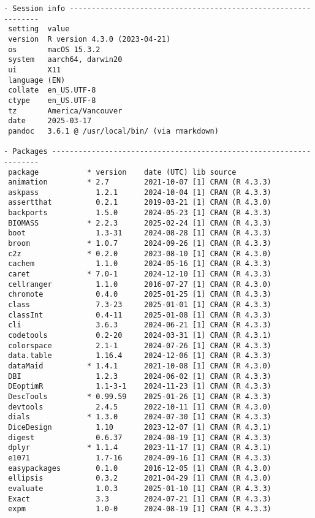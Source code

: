 \documentclass[
]{article}
\begin{document}
\begin{verbatim}
- Session info ---------------------------------------------------------------
 setting  value
 version  R version 4.3.0 (2023-04-21)
 os       macOS 15.3.2
 system   aarch64, darwin20
 ui       X11
 language (EN)
 collate  en_US.UTF-8
 ctype    en_US.UTF-8
 tz       America/Vancouver
 date     2025-03-17
 pandoc   3.6.1 @ /usr/local/bin/ (via rmarkdown)

- Packages -------------------------------------------------------------------
 package           * version    date (UTC) lib source
 animation         * 2.7        2021-10-07 [1] CRAN (R 4.3.3)
 askpass             1.2.1      2024-10-04 [1] CRAN (R 4.3.3)
 assertthat          0.2.1      2019-03-21 [1] CRAN (R 4.3.0)
 backports           1.5.0      2024-05-23 [1] CRAN (R 4.3.3)
 BIOMASS           * 2.2.3      2025-02-24 [1] CRAN (R 4.3.3)
 boot                1.3-31     2024-08-28 [1] CRAN (R 4.3.3)
 broom             * 1.0.7      2024-09-26 [1] CRAN (R 4.3.3)
 c2z               * 0.2.0      2023-08-10 [1] CRAN (R 4.3.0)
 cachem              1.1.0      2024-05-16 [1] CRAN (R 4.3.3)
 caret             * 7.0-1      2024-12-10 [1] CRAN (R 4.3.3)
 cellranger          1.1.0      2016-07-27 [1] CRAN (R 4.3.0)
 chromote            0.4.0      2025-01-25 [1] CRAN (R 4.3.3)
 class               7.3-23     2025-01-01 [1] CRAN (R 4.3.3)
 classInt            0.4-11     2025-01-08 [1] CRAN (R 4.3.3)
 cli                 3.6.3      2024-06-21 [1] CRAN (R 4.3.3)
 codetools           0.2-20     2024-03-31 [1] CRAN (R 4.3.1)
 colorspace          2.1-1      2024-07-26 [1] CRAN (R 4.3.3)
 data.table          1.16.4     2024-12-06 [1] CRAN (R 4.3.3)
 dataMaid          * 1.4.1      2021-10-08 [1] CRAN (R 4.3.0)
 DBI                 1.2.3      2024-06-02 [1] CRAN (R 4.3.3)
 DEoptimR            1.1-3-1    2024-11-23 [1] CRAN (R 4.3.3)
 DescTools         * 0.99.59    2025-01-26 [1] CRAN (R 4.3.3)
 devtools            2.4.5      2022-10-11 [1] CRAN (R 4.3.0)
 dials             * 1.3.0      2024-07-30 [1] CRAN (R 4.3.3)
 DiceDesign          1.10       2023-12-07 [1] CRAN (R 4.3.1)
 digest              0.6.37     2024-08-19 [1] CRAN (R 4.3.3)
 dplyr             * 1.1.4      2023-11-17 [1] CRAN (R 4.3.1)
 e1071               1.7-16     2024-09-16 [1] CRAN (R 4.3.3)
 easypackages        0.1.0      2016-12-05 [1] CRAN (R 4.3.0)
 ellipsis            0.3.2      2021-04-29 [1] CRAN (R 4.3.0)
 evaluate            1.0.3      2025-01-10 [1] CRAN (R 4.3.3)
 Exact               3.3        2024-07-21 [1] CRAN (R 4.3.3)
 expm                1.0-0      2024-08-19 [1] CRAN (R 4.3.3)

\end{verbatim}
\end{document}
